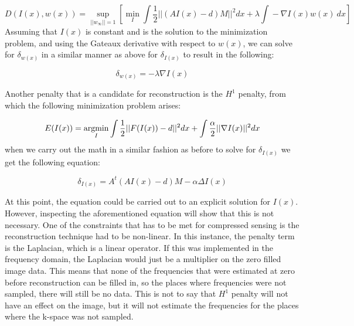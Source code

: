 \begin{equation}
D(I(x),w(x)) = \sup_{||{w}_{\infty}||=1}\left[\min_I  \int{}\frac{1}{2}||(AI(x) - d)M||^{2}dx + \lambda{}\int{}-\nabla{}I(x)w(x) \ dx\right]
\end{equation}
Assuming that $I(x)$ is constant and is the solution to the minimization problem, and using the Gateaux derivative with respect to $w(x)$, we can solve for $\delta_{w(x)}$ in a similar manner as above for $\delta_{I(x)}$ to result in the following:
	
\begin{equation}
\delta_{w(x)} = -\lambda{}\nabla{}I(x) 
\end{equation}

Another penalty that is a candidate for reconstruction is the $H^1$ penalty, from which the following minimization problem arises:

\begin{equation}
E(I(x)) = \operatorname*{argmin}_I \int{}\frac{1}{2}||F(I(x)) - d||^{2}dx + \int{}\frac{\alpha{}}{2}||\nabla{}I(x)||^2dx
\end{equation}
when we carry out the math in a similar fashion as before to solve for $\delta_{I(x)}$ we get the following equation:

\begin{equation}
\delta_{I(x)} = A^t(AI(x)- d)M - \alpha{}\Delta{}I(x)
\end{equation}

At this point, the equation could be carried out to an explicit solution for $I(x)$.  However, inspecting the aforementioned equation will show that this is not necessary.  One of the constraints that has to be met for compressed sensing is the reconstruction technique had to be non-linear.  In this instance, the penalty term is the Laplacian, which is a linear operator. If this was implemented in the frequency domain, the Laplacian would just be a multiplier on the zero filled image data. This means that none of the frequencies that were estimated at zero before reconstruction can be filled in, so the places where frequencies were not sampled, there will still be no data.  This is not to say that $H^1$ penalty will not have an effect on the image, but it will not estimate the frequencies for the places where the k-space was not sampled.   
 
